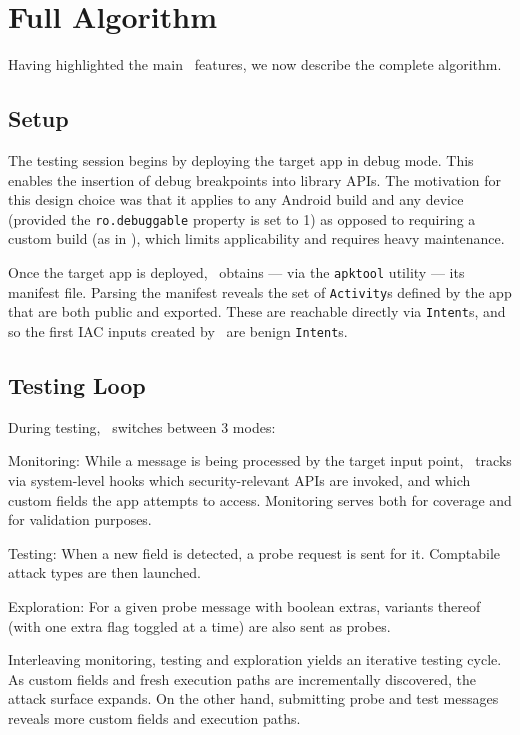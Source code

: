 \section{Full Algorithm}\label{Se:fullalg}

Having highlighted the main \Tool\ features, we now describe the complete algorithm.

\subsection{Setup}

The testing session begins by deploying the target app in debug mode. This enables the insertion of debug breakpoints into library APIs. The motivation for this design choice was that it applies to any Android build and any device  (provided the {\tt ro.debuggable} property is set to 1) as opposed to requiring a custom build (as in \cite{EGCCJMS:OSDI10}), which limits applicability and requires heavy maintenance.

Once the target app is deployed, \Tool\ obtains --- via the {\tt apktool} utility --- its manifest file. Parsing the manifest reveals the set of {\tt Activity}s defined by the app that are both public and exported. These are reachable directly via {\tt Intent}s, and so the first IAC inputs created by \Tool\ are benign {\tt Intent}s.

\subsection{Testing Loop}

During testing, \Tool\ switches between 3 modes:
\begin{compactitem}
	\item Monitoring: While a message is being processed by the target input point, \Tool\ tracks via system-level hooks which security-relevant APIs are invoked, and which custom fields the app attempts to access. Monitoring serves both for coverage and for validation purposes.
	\item Testing: When a new field is detected, a probe request is sent for it. Comptabile attack types are then launched. 
	\item Exploration: For a given probe message with boolean extras, variants thereof (with one extra flag toggled at a time) are also sent as probes.
\end{compactitem}
Interleaving monitoring, testing and exploration yields an iterative testing cycle. As custom fields and fresh execution paths are incrementally discovered, the attack surface expands. On the other hand, submitting probe and test messages reveals more custom fields and execution paths. 

